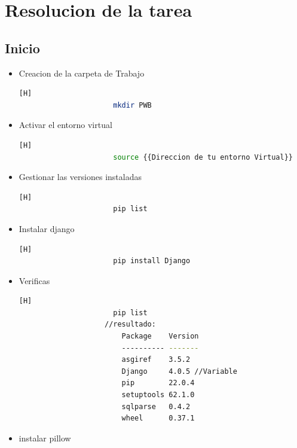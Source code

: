 \documentclass{article}
\begin{document}
	\section{Resolucion de la tarea}
    \subsection{Inicio}
    \begin{itemize}
        \item Creacion de la carpeta de Trabajo
        \begin{lstlisting}[language=bash,caption={Entorno de Linux-Ejecute el script de activación para activar el entorno virtual:}][H]
    		          mkdir PWB
    	\end{lstlisting}
        \item Activar el entorno virtual
        \begin{lstlisting}[language=bash,caption={Entorno de Linux-Ejecute el script de activación para activar el entorno virtual:}][H]
    		          source {{Direccion de tu entorno Virtual}}
    	\end{lstlisting}
         \item Gestionar las versiones instaladas
        \begin{lstlisting}[language=bash,caption={Entorno de Linux-Ejecute el script de activación para activar el entorno virtual:}][H]
    		          pip list
    	\end{lstlisting}
        \item Instalar django
        \begin{lstlisting}[language=bash,caption={Entorno de Linux-Ejecute el script de activación para activar el entorno virtual:}][H]
    		          pip install Django
    	\end{lstlisting}
        \item Verificas
        \begin{lstlisting}[language=bash,caption={Entorno de Linux-Ejecute el script de activación para activar el entorno virtual:}][H]
    		          pip list
                    //resultado:
                        Package    Version
                        ---------- -------
                        asgiref    3.5.2
                        Django     4.0.5 //Variable
                        pip        22.0.4
                        setuptools 62.1.0
                        sqlparse   0.4.2
                        wheel      0.37.1
    	\end{lstlisting}
        \item instalar pillow

\end{itemize}
\end{document}

